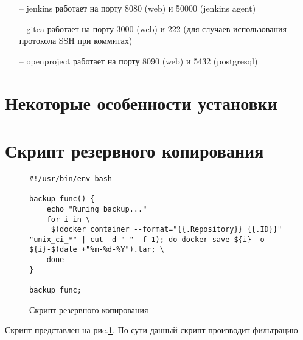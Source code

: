 \documentclass[a4paper]{extarticle}
\begin{document}
\begin{itemize}
\item[--] jenkins работает на порту 8080 (web) и 50000 (jenkins agent)
\item[--] gitea работает на порту 3000 (web) и 222 (для случаев использования протокола SSH при коммитах)
\item[--] openproject работает на порту 8090 (web) и 5432 (postgresql)
\end{itemize}

\section{Некоторые особенности установки}

\section{Скрипт резервного копирования}

\begin{figure}
\begin{verbatim}
#!/usr/bin/env bash

backup_func() {
	echo "Runing backup..."
	for i in \
	 $(docker container --format="{{.Repository}} {{.ID}}" "unix_ci_*" | cut -d " " -f 1); do docker save ${i} -o ${i}-$(date +"%m-%d-%Y").tar; \
	done
}

backup_func;
\end{verbatim}
\caption{Скрипт резервного копирования}
\label{fig:backup}
\end{figure}

Скрипт представлен на риc.\ref{fig:backup}. По сути данный  скрипт производит фильтрацию
\end{document}
